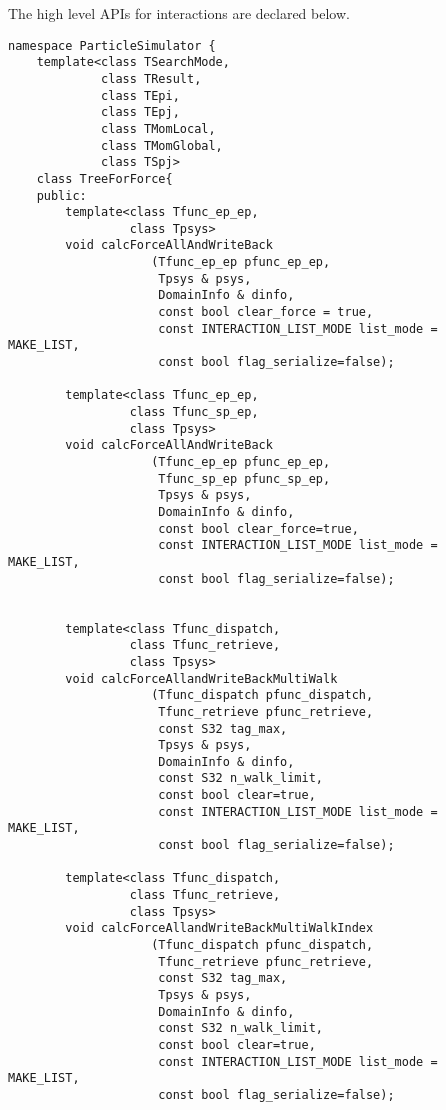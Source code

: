 
The high level APIs for interactions are declared below.

\begin{lstlisting}[caption=TreeForForce1]
namespace ParticleSimulator {
    template<class TSearchMode,
             class TResult,
             class TEpi,
             class TEpj,
             class TMomLocal,
             class TMomGlobal,
             class TSpj>
    class TreeForForce{
    public:
        template<class Tfunc_ep_ep,
                 class Tpsys>
        void calcForceAllAndWriteBack
                    (Tfunc_ep_ep pfunc_ep_ep,
                     Tpsys & psys,
                     DomainInfo & dinfo,
                     const bool clear_force = true,
                     const INTERACTION_LIST_MODE list_mode = MAKE_LIST,
                     const bool flag_serialize=false);
                     
        template<class Tfunc_ep_ep,
                 class Tfunc_sp_ep,
                 class Tpsys>
        void calcForceAllAndWriteBack
                    (Tfunc_ep_ep pfunc_ep_ep,
                     Tfunc_sp_ep pfunc_sp_ep,  
                     Tpsys & psys,
                     DomainInfo & dinfo,
                     const bool clear_force=true,
                     const INTERACTION_LIST_MODE list_mode = MAKE_LIST,
                     const bool flag_serialize=false);

                     
        template<class Tfunc_dispatch,
                 class Tfunc_retrieve,
                 class Tpsys>
        void calcForceAllandWriteBackMultiWalk
                    (Tfunc_dispatch pfunc_dispatch,
                     Tfunc_retrieve pfunc_retrieve,
                     const S32 tag_max,
                     Tpsys & psys,
                     DomainInfo & dinfo,
                     const S32 n_walk_limit, 
                     const bool clear=true,
                     const INTERACTION_LIST_MODE list_mode = MAKE_LIST,
                     const bool flag_serialize=false); 
     
        template<class Tfunc_dispatch,
                 class Tfunc_retrieve,
                 class Tpsys>
        void calcForceAllandWriteBackMultiWalkIndex
                    (Tfunc_dispatch pfunc_dispatch,
                     Tfunc_retrieve pfunc_retrieve,
                     const S32 tag_max,
                     Tpsys & psys,
                     DomainInfo & dinfo,
                     const S32 n_walk_limit,
                     const bool clear=true,
                     const INTERACTION_LIST_MODE list_mode = MAKE_LIST,
                     const bool flag_serialize=false);


\end{lstlisting}
